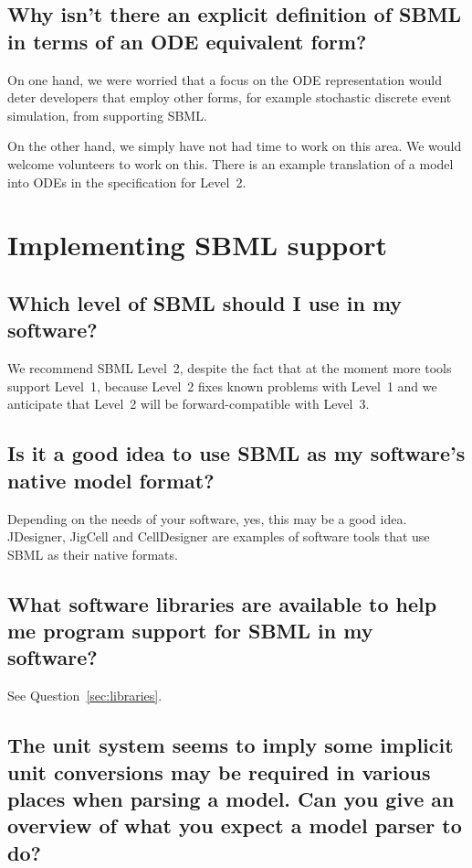 \documentclass{sbmlfaq}
\begin{document}
\subsection{Why isn't there an explicit definition of SBML in terms of an
  ODE equivalent form?} 

On one hand, we were worried that a focus on the ODE representation would
deter developers that employ other forms, for example stochastic discrete
event simulation, from supporting SBML.

On the other hand, we simply have not had time to work on this area.  We
would welcome volunteers to work on this.  There is an example translation of
a model into ODEs in the specification for Level~2.


\section{Implementing SBML support}

\subsection{Which level of SBML should I use in my software?}
\label{sec:which-level-to-use}

We recommend SBML Level~2, despite the fact that at the moment more tools
support Level~1, because Level~2 fixes known problems with Level~1 and
we anticipate that Level~2 will be forward-compatible with Level~3.


\subsection{Is it a good idea to use SBML as my software's native model format?}

Depending on the needs of your software, yes, this may be a good idea.
JDesigner, JigCell and CellDesigner are examples of software tools that use
SBML as their native formats.


\subsection{What software libraries are available to help me program
  support for SBML in my software?}  

See Question~\ref{sec:libraries}.


\subsection{The unit system seems to imply some implicit unit conversions may be required in various places when parsing a model.
Can you give an overview of what you expect a model parser to do?}
\end{document}
